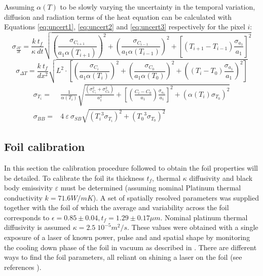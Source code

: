 Assuming $\alpha(T)$ to be slowly varying the uncertainty in the temporal variation, diffusion and radiation terms of the heat equation can be calculated with Equations \ref{eq:uncert1}, \ref{eq:uncert2} and \ref{eq:uncert3} respectively for the pixel $i$:
\begin{equation}
{\sigma }_{ \frac {\partial T} {\partial t}} = \frac{k \: t_f}{\kappa \: dt}  \sqrt{ \left ( \frac {{\sigma }_{C_{i+1}}} { a_1 \alpha(T_{i+1}) } \right )^2 + \left ( \frac {{\sigma }_{C_{i-1}}} { a_1 \alpha(T_{i-1}) } \right )^2 + \left [ \left ( T_{i+1}-T_{i-1} \right ) \frac {{\sigma }_{a_1}} {a_1} \right ]^2 } 
\label{eq:uncert1}
\end{equation}
\begin{equation}
{\sigma }_{ \Delta T} = \frac {k \: t_f} {dx^2} \sqrt{ L^2 \cdot \left[  \left(  \frac {{\sigma }_{C_i}} { a_1 \alpha(T_i) } \right)^2 + \left( \frac {{\sigma }_{C_0}} { a_1 \alpha(T_0) } \right)^2 + \left( ({T_i -T_0}) \frac {{\sigma }_{a_1}} {a_1} \right)^2 \right] } 
\label{eq:uncert2}
\end{equation}
\begin{equation}
\begin{aligned}
{\sigma }_{T_i} =& \frac 1 {\alpha(T_i)} \sqrt{ \frac {({\sigma }_{C_i}^2 + {\sigma }_{C_0}^2 )} { a_1^2 } + \left [ \left (\frac {C_i -C_0} {a_1} \right ) \frac {{\sigma }_{a_1}} {a_1} \right ]^2  + (\alpha(T_i) {\sigma }_{T_0})^2 } \\ {\sigma }_{ BB} =& 4 \: \varepsilon \: \sigma_{SB} \sqrt{ ({T_i}^3 {\sigma }_{T_i})^2 + ({T_0}^3 {\sigma }_{T_0})^2 }
\label{eq:uncert3}
\end{aligned}
\end{equation}

\subsection{Foil calibration}\label{Foil calibration}
In this section the calibration procedure followed to obtain the foil properties will be detailed. To calibrate the foil its thickness $t_f$, thermal $\kappa$ diffusivity and black body emissivity $\varepsilon$ must be determined (assuming nominal Platinum thermal conductivity $k=71.6W/mK$). A set of spatially resolved parameters was supplied together with the foil of which the average and variability across the foil corresponds to ${\epsilon=0.85\pm0.04}, {t_f=1.29\pm0.17 \mu m}$. Nominal platinum thermal diffusivity is assumed ${\kappa=2.5\;10^{-5}m^2/s}$. These values were obtained with a single exposure of a laser of known power, pulse and and spatial shape by monitoring the cooling down phase of the foil in vacuum as described in \cite{Itomi2014}. There are different ways to find the foil parameters, all reliant on shining a laser on the foil (see references \cite{Sano2012,Itomi2014,Cernuschi2001}).

